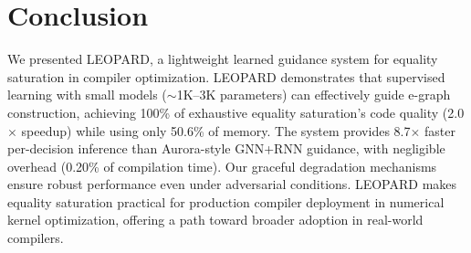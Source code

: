 \documentclass{article}
\begin{document}
\section{Conclusion}
\label{sec:conclusion}

We presented LEOPARD, a lightweight learned guidance system for equality saturation in compiler optimization. LEOPARD demonstrates that supervised learning with small models ($\sim$1K--3K parameters) can effectively guide e-graph construction, achieving 100\% of exhaustive equality saturation's code quality (2.0$\times$ speedup) while using only 50.6\% of memory. The system provides 8.7$\times$ faster per-decision inference than Aurora-style GNN+RNN guidance, with negligible overhead (0.20\% of compilation time). Our graceful degradation mechanisms ensure robust performance even under adversarial conditions. LEOPARD makes equality saturation practical for production compiler deployment in numerical kernel optimization, offering a path toward broader adoption in real-world compilers.
\end{document}
